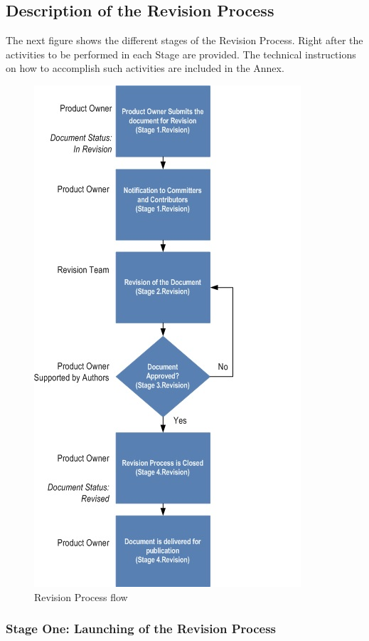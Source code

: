 \documentclass{template/openetcs_article}
\begin{document}
\subsection{Description of the Revision Process}

The next figure shows the different stages of the Revision Process. Right after the activities to be performed in each Stage are provided. The technical instructions on how to accomplish such activities are included in the Annex.

\begin{figure}[H]
\centering
\includegraphics{./figures/RevisionProcess.JPG}
\caption{Revision Process flow}
\end{figure}

\subsubsection{Stage One: Launching of the Revision Process}
\end{document}
